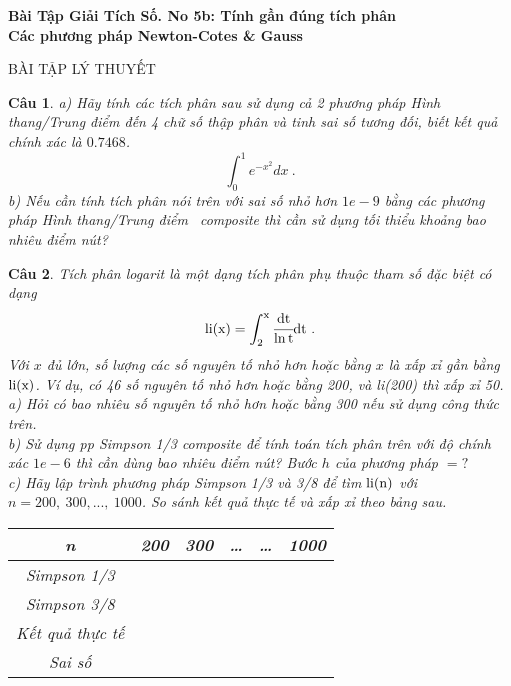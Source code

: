 \documentclass[11pt]{article}
\newtheorem{bt}{Câu}
\begin{document}



\begin{center}
	{\bf Bài Tập Giải Tích Số. No 5b: Tính gần đúng tích phân \\ Các phương pháp Newton-Cotes \& Gauss}
\end{center}

\begin{center}
	BÀI TẬP LÝ THUYẾT \\
\end{center}

\begin{bt}\label{bt1}
a) Hãy tính các tích phân sau sử dụng cả 2 phương pháp \emph{Hình thang/Trung điểm} đến 4 chữ số thập phân và tinh sai số tương đối, biết kết quả chính xác là $0.7468$. 
\[ \int_{0}^{1} e^{-x^2} dx \ . \]
%	
b) Nếu cần tính tích phân nói trên với sai số nhỏ hơn $1e-9$ bằng các phương pháp \emph{Hình thang/Trung điểm \ composite} thì cần sử dụng tối thiểu khoảng bao nhiêu điểm nút?
\end{bt}

\begin{bt}
Tích phân logarit là một dạng tích phân phụ thuộc tham số đặc biệt có dạng 
%
\[ \rm{li}(x) = \int_{2}^{x} \cfrac{dt}{\ln t} dt  \ . \]
%
Với $x$ đủ lớn, số lượng các số nguyên tố nhỏ hơn hoặc bằng $x$ là xấp xỉ gần bằng $\rm{li}(x)$. Ví dụ, có 46 số nguyên tố nhỏ hơn hoặc bằng 200, và li(200) thì xấp xỉ 50. \\
a) Hỏi có bao nhiêu số nguyên tố nhỏ hơn hoặc bằng 300 nếu sử dụng công thức trên. \\
b) Sử dụng pp Simpson 1/3 composite để tính toán tích phân trên với độ chính xác $1e-6$ thì cần dùng bao nhiêu điểm nút? Bước $h$ của phương pháp $=?$ \\
c) Hãy lập trình phương pháp Simpson 1/3 và 3/8 để tìm $\rm{li}(n)$ với $n=200,\ 300, ...,\ 1000$. So sánh kết quả thực tế và xấp xỉ theo bảng sau.
%
\begin{center}
\begin{tabular}{|c|c|c|c|c|c|}
	\hline
	n &  200 & 300 & \dots  & \dots & 1000  \\
	\hline
	Simpson 1/3 &  &  &  &  &  \\
	\hline
	Simpson 3/8 &  &  &  &  &  \\
	\hline
    Kết quả thực tế &  &  &  &  &  \\
    \hline
    Sai số &  &  &  &  &  \\
    \hline		
\end{tabular}
\end{center}
%
\end{bt}
\end{document}
